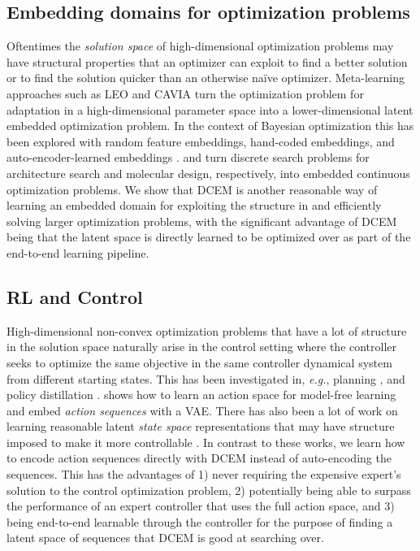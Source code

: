 \documentclass{article}
\newcommand{\eg}{{\it e.g.}\xspace}
\begin{document}
\subsection{Embedding domains for optimization problems}
Oftentimes the \emph{solution space} of high-dimensional
optimization problems may have structural properties that
an optimizer can exploit to find a better solution or
to find the solution quicker than an otherwise na\"ive optimizer.
Meta-learning approaches such as LEO \citep{rusu2018meta} and
CAVIA \citep{zintgraf2019fast} turn the optimization
problem for adaptation in a high-dimensional parameter space into
a lower-dimensional latent embedded optimization problem.
In the context of Bayesian optimization this has been
explored with random feature embeddings, hand-coded embeddings,
and auto-encoder-learned embeddings
\citep{antonova2019bayesian,oh2018bock,calandra2016manifold,wang2016bayesian,garnett2013active,salem2019sequential,kirschner2019adaptive}.
\citet{luo2018neural} and \citet{gomez2018automatic} turn
discrete search problems for architecture search and molecular design,
respectively, into embedded continuous optimization problems.
We show that DCEM is another reasonable way of learning
an embedded domain for exploiting the structure in and efficiently
solving larger optimization problems, with the significant advantage
of DCEM being that the latent space is directly learned to be
optimized over as part of the end-to-end learning pipeline.

\subsection{RL and Control}
\label{ref:bg:rl}
High-dimensional non-convex optimization problems that have a lot of
structure in the solution space naturally arise in the control setting
where the controller seeks to optimize the same objective in
the same controller dynamical system from different starting states.
This has been investigated in, \eg,
planning
\citep{ichter2018learning,ichter2019robot,mukadam2018continuous,kurutach2018learning,srinivas2018universal,yu2019unsupervised,lynch2019learning},
and policy distillation \citep{wang2019exploring}.
\citet{chandak2019learning} shows how to learn an action space
for model-free learning and \citet{co2018self,antonova2019bayesian}
embed \emph{action sequences} with a VAE.
There has also been a lot of work on learning reasonable
latent \emph{state space} representations \citep{tasfi2018dynamic,zhang2018solar,gelada2019deepmdp,miladinovic2019disentangled}
that may have structure imposed to make it more controllable
\citep{watter2015embed,banijamali2017robust,ghosh2018learning,anand2019unsupervised,levine2019prediction,singh2019learning}.
In contrast to these works, we learn how to encode action sequences directly
with DCEM instead of auto-encoding the sequences.
This has the advantages of 1) never requiring the expensive expert's
solution to the control optimization problem, 2) potentially being able to surpass
the performance of an expert controller that uses the full action space, and
3) being end-to-end learnable through the controller for the
purpose of finding a latent space of sequences that DCEM
is good at searching over.
\end{document}
